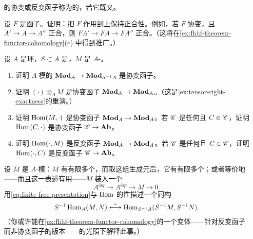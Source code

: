\trAdditive{}的协变或反变函子称为\trExact{}的，若它既\trLeftExact{}又\trRightExact。

\begin{exercise}\label{ex:exact-functors-preserve-exactness}
设 $F$ 是\trExact{}函子。证明：把 $F$ 作用到\trExactSequence{}上保持正合性。例如，若 $F$ 协变，且 $A'\to A\to A''$ 正合，则 $FA'\to FA\to FA''$ 正合。（这将在\cref{ex:fhhf-theorem-functor-cohomology}(c) 中得到推广。）
\end{exercise}

\begin{exercise}\label{ex:localization-tensor-hom-exactness}
设 $A$ 是环，$S\subset A$ 是\trMultiplicativeSubset，$M$ 是 $A$-\trModule。
\begin{enumerate}[label=(\alph*)]
\item 证明 $A$-模的\trLocalization{} $\mathbf{Mod}_{A}\to\mathbf{Mod}_{S^{-1}A}$ 是\trExact{}协变函子。
\item 证明 $(\cdot)\otimes_A M$ 是\trRightExact{}协变函子 $\mathbf{Mod}_{A}\to\mathbf{Mod}_{A}$。（这是\cref{ex:tensor-right-exactness}的重演。）
\item 证明 $\operatorname{Hom}(M,\cdot)$ 是\trLeftExact{}协变函子 $\mathbf{Mod}_{A}\to\mathbf{Mod}_{A}$。若 $\mathscr{C}$ 是任何\trAbelianCategory{}且 $C\in\mathscr{C}$，证明 $\operatorname{Hom}(C,\cdot)$ 是\trLeftExact{}协变函子 $\mathscr{C}\to\mathbf{Ab}$。
\item 证明 $\operatorname{Hom}(\cdot,M)$ 是\trLeftExact{}反变函子 $\mathbf{Mod}_{A}\to\mathbf{Mod}_{A}$。若 $\mathscr{C}$ 是任何\trAbelianCategory{}且 $C\in\mathscr{C}$，证明 $\operatorname{Hom}(\cdot,C)$ 是\trLeftExact{}反变函子 $\mathscr{C}\to\mathbf{Ab}$。
\end{enumerate}
\end{exercise}

\begin{exercise}\label{ex:finitely-presented-hom-localization}
设 $M$ 是\trFinitelyPresented{} $A$-模：$M$ 有有限多个\trGenerators，而取这组生成元后，它有有限多个\trRelation；或者等价地——而且这一表述有用——$M$ 装入一个\trExactSequence
\begin{equation*}\tag{1.5.9.1}\label{eq:finite-free-presentation}
A^{\oplus q}\longrightarrow A^{\oplus p}\longrightarrow M\longrightarrow 0.
\end{equation*}
用\eqref{eq:finite-free-presentation}与 $\operatorname{Hom}$ 的\trLeftExact{}性描述一个同构
\[
S^{-1}\Hom_A(M,N)\mathrel{\overset{\sim}{\leftarrow\joinrel\rightarrow}}\Hom_{S^{-1}A}(S^{-1}M,S^{-1}N).
\]
（你或许能在\cref{ex:fhhf-theorem-functor-cohomology}的一个变体——针对\trLeftExact{}反变函子而非\trRightExact{}协变函子的版本——的光照下解释此事。）
\end{exercise}

